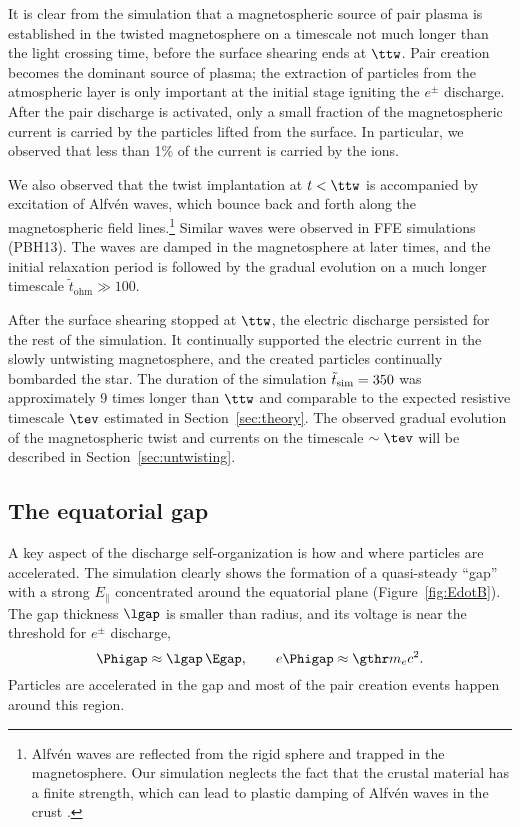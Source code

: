 It is clear from the simulation that a magnetospheric source of pair plasma is
established in the twisted magnetosphere on a timescale not much longer than the
light crossing time, before the surface shearing ends at $\ttw$. Pair creation
becomes the dominant source of plasma; the extraction of particles from the
atmospheric layer is only important at the initial stage igniting the $e^\pm$
discharge. After the pair discharge is activated, only a small fraction of the
magnetospheric current is carried by the particles lifted from the surface. In
particular, we observed that less than 1\% of the current is carried by the
ions.

We also observed that the twist implantation at $t<\ttw$ is accompanied by excitation
of Alfv\'en waves, which bounce back and forth along the magnetospheric field
lines.\footnote{Alfv\'en waves
    are reflected from the rigid sphere and trapped in the magnetosphere. Our simulation
    neglects the fact that the crustal material has a finite strength, which can lead to
    plastic damping of Alfv\'en waves in the crust
    \citep{2015ApJ...815...25L}.
  }
Similar waves were observed in FFE simulations (PBH13).
The waves are damped in the magnetosphere at later times, and the initial relaxation
period is followed by the gradual evolution on a much longer timescale $\tilde{t}_\mathrm{ohm}\gg 100$.

After the surface shearing stopped at $\ttw$, the electric discharge
persisted for the rest of the simulation. It continually supported the electric current in
the slowly untwisting magnetosphere, and the created particles continually bombarded the star.
The duration of the simulation $\tilde{t}_{\rm sim}=350$ was approximately 9 times longer than
$\ttw$ and comparable to the expected resistive timescale $\tev$ estimated in Section~\ref{sec:theory}.
The observed gradual evolution of the magnetospheric twist and currents on the
timescale $\sim\tev$ will be described in Section~\ref{sec:untwisting}.


\subsection{The equatorial gap}
\label{sec:gap}


A key aspect of the discharge self-organization is how and where
particles are accelerated. The simulation clearly shows the formation of a quasi-steady
``gap'' with a strong $E_\parallel$ concentrated around the equatorial plane
(Figure~\ref{fig:EdotB}). The gap thickness $\lgap$ is smaller than radius,
and its voltage is near the threshold for $e^\pm$ discharge,
\begin{equation}
  \Phigap\approx\lgap\,\Egap, \qquad e\Phigap\approx\gthr m_ec^2.
\end{equation}
Particles are accelerated in the gap and most of the pair
creation events happen around this region.


